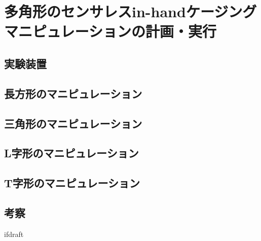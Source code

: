 \documentclass[a4paper,twoside,12pt,papersize, dvipdfmx]{iirthesis}
\begin{document}
    \newcommand{\figref}[1]{\figurename\ref{#1}}
    \newcommand{\tabref}[1]{\tablename\ref{#1}}
    \renewcommand{\eqref}[1]{式~(\ref{#1})}
    \newcommand{\chapref}[1]{\ref{#1}章}
    \newcommand{\secref}[1]{\ref{#1}節}
    \newcommand{\ssecref}[1]{\ref{#1}項}
    \newcommand{\appref}[1]{付録\ref{#1}}
\fi


\chapter{多角形のセンサレスin-handケージングマニピュレーションの計画・実行}
\minitoc

\section{実験装置}

\section{長方形のマニピュレーション}
\section{三角形のマニピュレーション}
\section{L字形のマニピュレーション}
\section{T字形のマニピュレーション}
\section{考察}




\expandafter\ifx\csname ifdraft\endcsname\relax
    
\end{document}
